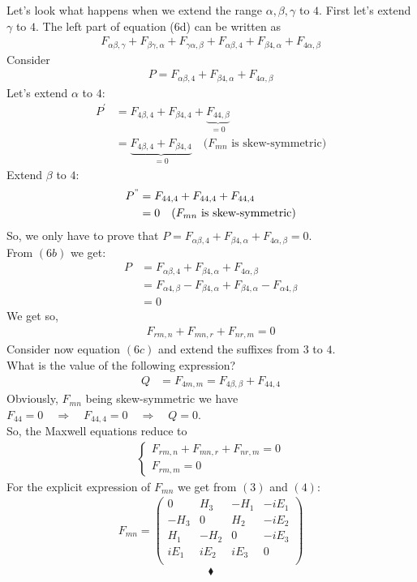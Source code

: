 Let's look what happens when we extend the range  $\alpha,\beta,\gamma$ to $4$. First let's extend  $\gamma$ to $4$. The left part of equation (6d) can be written as 
\begin{align}
F_{\alpha\beta,\gamma}+F_{\beta\gamma,\alpha}+F_{\gamma\alpha,\beta}+ F_{\alpha\beta,4}+F_{\beta4,\alpha}+F_{4\alpha,\beta}
\end{align}
Consider 
\begin{align}
P= F_{\alpha\beta,4}+F_{\beta4,\alpha}+F_{4\alpha,\beta}
\end{align}
Let's extend $\alpha$ to $4$:
\begin{align}
P^{'}&= F_{4\beta,4}+F_{\beta4,4}+\underbrace{F_{44,\beta}}_{=0}\\
&= \underbrace{F_{4\beta,4}+F_{\beta4,4}}_{=0}\quad \text{(}F_{mn} \text{ is skew-symmetric)}
\end{align}
Extend $\beta$ to $4$:
\begin{align}
P^{"}&= F_{44,4}+F_{44,4}+F_{44,4}\\
&=0\quad \text{(}F_{mn} \text{ is skew-symmetric)}
\end{align}
So, we only have to prove that $P= F_{\alpha\beta,4}+F_{\beta4,\alpha}+F_{4\alpha,\beta}=0$.\\
From $(6b)$ we get:
\begin{align}
P&= F_{\alpha\beta,4}+F_{\beta4,\alpha}+F_{4\alpha,\beta}\\
&= F_{\alpha4,\beta}-F_{\beta4,\alpha}+F_{\beta4,\alpha}-F_{\alpha4,\beta}\\
&=0
\end{align}
We get so,
\begin{align}
F_{rm,n}+F_{mn,r}+F_{nr,m}=0
\end{align}
Consider now equation $(6c)$ and extend the suffixes from $3$ to $4$.\\
What is the value of the following expression?
\begin{align}
Q&=F_{4m,m}=F_{4\beta,\beta} + F_{44,4}
\end{align}
Obviously, $F_{mn}$ being skew-symmetric we have $F_{44}=0\quad\Rightarrow\quad F_{44,4}=0 \quad \Rightarrow\quad Q=0$.\\
So, the Maxwell equations reduce to 
\begin{align}\left\{\begin{array}{l}
F_{rm,n}+F_{mn,r}+F_{nr,m}=0\\
F_{rm,m}=0
\end{array}\right.
\end{align}
For the explicit expression of $F_{mn}$ we get from $(3)$ and $(4)$:
\begin{align}
F_{mn}=
\left(
\begin{matrix}
0&H_3&-H_1&-iE_1\\
-H_3&0&H_2&-iE_2\\
H_1&-H_2&0&-iE_3\\
iE_1&iE_2&iE_3&0\\
\end{matrix}
\right)
\end{align}
 $$\blacklozenge$$
\newpage



